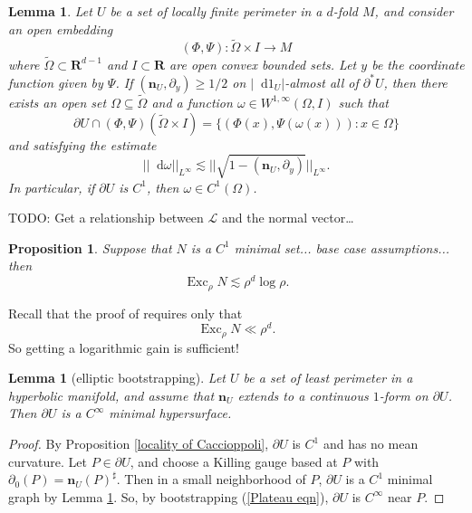 \documentclass[reqno,10pt]{amsart}
\newcommand{\RR}{\mathbf{R}}
\DeclareMathOperator{\Exc}{Exc}
\newcommand*\dif{\mathop{}\!\mathrm{d}}
\newcommand{\Lagrange}{\mathscr L}
\newcommand{\normal}{\mathbf n}
\newtheorem{lemma}[theorem]{Lemma}
\newtheorem{proposition}[theorem]{Proposition}
\theoremstyle{definition}
\numberwithin{equation}{section}
\begin{document}
\begin{lemma}\label{sets are graphs}
Let $U$ be a set of locally finite perimeter in a $d$-fold $M$, and consider an open embedding
\begin{equation}\label{coordinates for making a graph}
(\Phi, \Psi): \tilde \Omega \times I \to M
\end{equation}
where $\tilde \Omega \subset \RR^{d - 1}$ and $I \subset \RR$ are open convex bounded sets.
Let $y$ be the coordinate function given by $\Psi$.
If $(\normal_U, \partial_y) \geq 1/2$ on $|\dif 1_U|$-almost all of $\partial^* U$, then there exists an open set $\Omega \subseteq \tilde \Omega$ and a function $\omega \in W^{1, \infty}(\Omega, I)$ such that 
$$\partial U \cap (\Phi, \Psi)(\tilde \Omega \times I) = \{(\Phi(x), \Psi(\omega(x))): x \in \Omega\}$$
and satisfying the estimate 
\begin{equation}\label{estimate on dif omega}
||\dif \omega||_{L^\infty} \lesssim ||\sqrt{1 - (\normal_U, \partial_y)}||_{L^\infty}.
\end{equation}
In particular, if $\partial U$ is $C^1$, then $\omega \in C^1(\Omega)$.
\end{lemma}

TODO: Get a relationship between $\Lagrange$ and the normal vector\dots

\begin{proposition}
Suppose that $N$ is a $C^1$ minimal set... base case assumptions... then 
$$\Exc_\rho N \lesssim \rho^d \log \rho.$$
\end{proposition}

Recall that the proof of \cite[Theorem 8.1]{Giusti77} requires only that 
$$\Exc_\rho N \ll \rho^d.$$
So getting a logarithmic gain is sufficient!

\begin{lemma}[elliptic bootstrapping]\label{C1 implies smooth}
Let $U$ be a set of least perimeter in a hyperbolic manifold, and assume that $\normal_U$ extends to a continuous $1$-form on $\partial U$.
Then $\partial U$ is a $C^\infty$ minimal hypersurface.
\end{lemma}
\begin{proof}
By Proposition \ref{locality of Caccioppoli}, $\partial U$ is $C^1$ and has no mean curvature.
Let $P \in \partial U$, and choose a Killing gauge based at $P$ with $\partial_0(P) = \normal_U(P)^\sharp$.
Then in a small neighborhood of $P$, $\partial U$ is a $C^1$ minimal graph by Lemma \ref{sets are graphs}.
So, by bootstrapping (\ref{Plateau eqn}), $\partial U$ is $C^\infty$ near $P$.
\end{proof}
\end{document}
